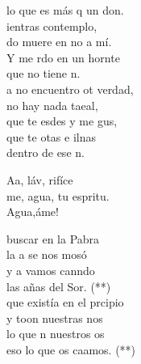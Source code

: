\documentclass[12pt]{article}
\begin{document}
\begin{multicols*}{2}
\begin{cancion}
	lo que es más q un don.\\
	ientras  contemplo, \\
	do muere en no a mí.\\
	Y me rdo en un hornte \\
	que no tiene n. \\
	a no encuentro ot verdad,\\
	 no hay nada taeal,\\
	que te esdes y me gus,\\
	que te otas e ilnas\\
	dentro de ese n.\\
\end{cancion}%

\begin{cancion}%
	Aa, láv, rifíce\\
	me, agua, tu espritu.\\
	Agua,áme!\\
\end{cancion}%

\begin{cancion}%
	 buscar en la Pabra\\
	la a se nos mosó\\
	y a  vamos canndo \\
	las añas del Sor. (**) \\
	 que existía en el prcipio \\
	y toon nuestras nos\\
	lo que n nuestros os \\
	eso lo que os caamos. (**)\\
\end{cancion}%


\end{multicols*}
\end{document}
